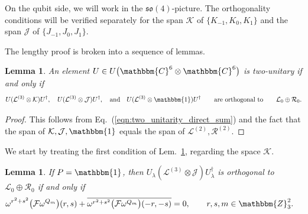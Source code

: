 \documentclass[aps,nofootinbib,floatfix,a4paper]{revtex4}
\newtheorem{lemma}[theorem]{Lemma}
\newcommand{\1}{\mbox{$\mathbf{1}$}}
\def\ZZ{\mathbbm{Z}}
\def\CC{\mathbbm{C}}
\def\F{\mathcal{F}}
\def\J{\mathcal{J}}
\def\K{\mathcal{K}}
\def\R{\mathcal{R}}
\def\Id{\mathbbm{1}}
\begin{document}
On the qubit side, we will work in the $\mathfrak{so}(4)$-picture.
The orthogonality conditions will be verified separately for the span
$\K$ of $\{K_{-1}, K_0, K_1\}$
and the 
span
$\J$  of $\{J_{-1}, J_0, J_1\}$.

The lengthy proof is broken into a sequence of lemmas.

\begin{lemma}\label{lem:two_unitary_kj}
	An element 
	$U\in U\big( \CC^6 \otimes \CC^6 \big)$ 
	is two-unitary if and only if
	\begin{align}\label{eqn:two_unitarity_on_kj}
		U(\mathcal{L}^{(3)}\otimes \K) U^\dagger,
		\quad
		U(\mathcal{L}^{(3)}\otimes \J) U^\dagger,
		\quad\text{and}\quad
		U(\mathcal{L}^{(3)}\otimes \Id) U^\dagger
		\qquad\text{are orthogonal to}\qquad
		\mathcal{L}_0 \oplus \mathcal{R}_0.
	\end{align}
\end{lemma}

\begin{proof}
	This follows from Eq.~(\ref{eqn:two_unitarity_direct_sum}) and the fact that the span of $\K, \J, \Id$ equals the span of 
	$\mathcal{L}^{(2)}, \R^{(2)}$.
\end{proof}

We start by treating the first condition of Lem.~\ref{lem:two_unitary_kj}, regarding the space $\K$.

\begin{lemma}\label{lem:k_lemma}
	If
	$P=\Id$,
	then
	$U_\lambda (\mathcal{L}^{(3)}\otimes \J) U_\lambda^\dagger$ is orthogonal to 
	$\mathcal{L}_0 \oplus \mathcal{R}_0$
	if and only if
	\begin{align}\label{eqn:k_orth_cond}
		\omega^{r^2+s^2} \big(\F \omega^{Q_m}\big)(r,s) 
		+
		\overline{
			\omega^{r^2+s^2} \big(\F \omega^{Q_m}\big)(-r,-s)  
		} %
		&=0,
		\qquad
		r,s,m\in\ZZ_3^2.
	\end{align}
\end{lemma}
\end{document}
